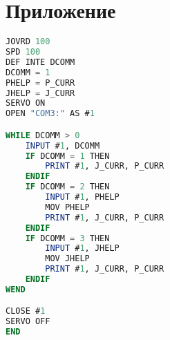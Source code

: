 \documentclass[a4paper,14pt]{extarticle}
\begin{document}
\section{Приложение}
\begin{lstlisting}[language=Basic, label=lst:finalmelfa, caption={Программа на роботе-манипуляторе для выполнения команд, присылаемых клиентом.}]
JOVRD 100
SPD 100
DEF INTE DCOMM
DCOMM = 1
PHELP = P_CURR
JHELP = J_CURR
SERVO ON
OPEN "COM3:" AS #1

WHILE DCOMM > 0
    INPUT #1, DCOMM
    IF DCOMM = 1 THEN
        PRINT #1, J_CURR, P_CURR
    ENDIF
    IF DCOMM = 2 THEN
        INPUT #1, PHELP
        MOV PHELP
        PRINT #1, J_CURR, P_CURR
    ENDIF
    IF DCOMM = 3 THEN
        INPUT #1, JHELP
        MOV JHELP
        PRINT #1, J_CURR, P_CURR
    ENDIF
WEND

CLOSE #1
SERVO OFF
END
\end{lstlisting}
\end{document}
